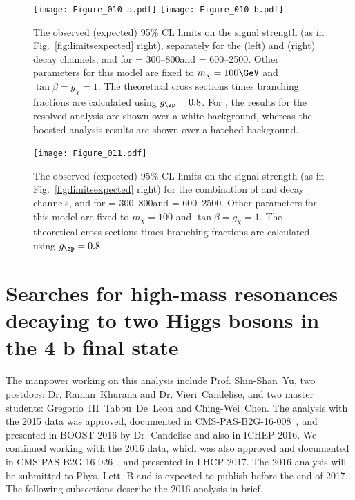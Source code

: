 \begin{figure}[htbp]
\centering
\texttt{[image: Figure\_010-a.pdf]}
\texttt{[image: Figure\_010-b.pdf]}
\caption{The observed (expected) 95\% CL limits on the signal strength (as in Fig.~\ref{fig:limitsexpected} right), separately for the \Hbb (left) and \HGG (right) decay channels, and for \maz = 300--800\GeV and \mzp = 600--2500\GeV. Other parameters for this model are fixed to $m_{\chi} = 100\GeV$ and $\tan{\beta} = g_{\chi} = 1$. The theoretical cross sections times branching fractions are calculated using $g_{\zp} = 0.8$. For \Hbb, the results for the resolved analysis are shown over a white background, whereas the boosted analysis results are shown over a hatched background. }
\label{fig:limit2d}
\end{figure}

\begin{figure}[htbp]
\centering
\texttt{[image: Figure\_011.pdf]}
\caption{The observed (expected) 95\% CL limits on the signal strength (as in Fig.~\ref{fig:limitsexpected} right) for the combination of \HGG and \Hbb decay channels, and for \maz = 300--800\GeV and \mzp = 600--2500\GeV. Other parameters for this model are fixed to $m_{\chi} = 100$ \GeV and $\tan{\beta} = g_{\chi} = 1$. The theoretical cross sections times branching fractions are calculated using $g_{\zp} = 0.8$.}
\label{fig:limit2dcombo}
\end{figure}


\section{Searches for high-mass resonances decaying to two Higgs bosons in the 4 b final state}
The manpower working on this analysis include Prof. Shin-Shan~Yu, 
two postdocs: Dr. Raman~Khurana and Dr. Vieri~Candelise, and 
two master students: Gregorio~III~Tabbu~De~Leon and Ching-Wei~Chen. 
The analysis with the 2015 data was approved, documented in 
CMS-PAS-B2G-16-008~\cite{CMS-PAS-B2G-16-008}, and presented in BOOST 2016 
by Dr. Candelise and also in ICHEP 2016. We continued working with the 2016 data, 
which was also approved and documented in 
CMS-PAS-B2G-16-026~\cite{CMS-PAS-B2G-16-026}, and presented in LHCP 2017. 
The 2016 analysis will be submitted to Phys. Lett. B and is expected to publish 
before the end of 2017. The following subsections describe the 2016 analysis in brief.



